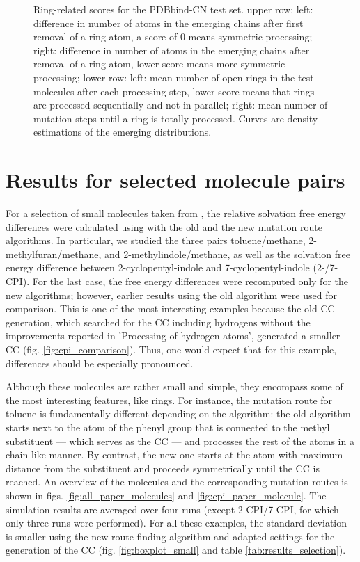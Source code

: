 \begin{figure}
	\caption{Ring-related scores for the PDBbind-CN test set. upper row: left: difference in number of atoms in the emerging chains after first removal of a ring atom, a score of 0 means symmetric processing; right: difference in number of atoms in the emerging chains after removal of a ring atom, lower score means more symmetric processing; lower row: left: mean number of open rings in the test molecules after each processing step, lower score means that rings are processed sequentially and not in parallel; right: mean number of mutation steps until a ring is totally processed. Curves are density estimations of the emerging distributions.}
	\label{fig:ring_related}
\end{figure}



\section{Results for selected molecule pairs}

For a selection of small molecules taken from \cite{Loeffler.2018, Wieder.2022}, the relative solvation free energy differences were calculated  using {\trafo} with the old and the new mutation route algorithms. In particular, we studied the three pairs toluene/methane, 2-methylfuran/methane, and 2-methylindole/methane, as well as the
solvation free energy difference between 2-cyclopentyl-indole and 7-cyclopentyl-indole (2-/7-CPI). For the last case, the free energy differences were recomputed only for the new algorithms; however, earlier results using the old algorithm were used for comparison. This is one of the most interesting examples because the old CC generation, which searched for the CC including hydrogens without the improvements reported in 'Processing of hydrogen atoms', generated a smaller CC (fig. \ref{fig:cpi_comparison}). Thus, one would expect that for this example, differences should be especially pronounced.

Although these molecules are rather small and simple, they encompass some of the most interesting features, like rings. For instance, the mutation route for toluene is fundamentally different depending on the algorithm: the old algorithm starts next to the atom of the phenyl group that is connected to the methyl substituent --- which serves as the CC --- and processes the rest of the atoms in a chain-like manner. By contrast, the new one starts at the atom with maximum distance from the substituent and proceeds symmetrically until the CC is reached.
An overview of the molecules and the corresponding mutation routes is shown in figs. \ref{fig:all_paper_molecules} and \ref{fig:cpi_paper_molecule}.
The simulation results are averaged over four runs (except 2-CPI/7-CPI, for which only three runs were performed). 
For all these examples, the standard deviation is smaller using the new route finding algorithm and adapted settings for the generation of the CC (fig. \ref{fig:boxplot_small} and table \ref{tab:results_selection}).

